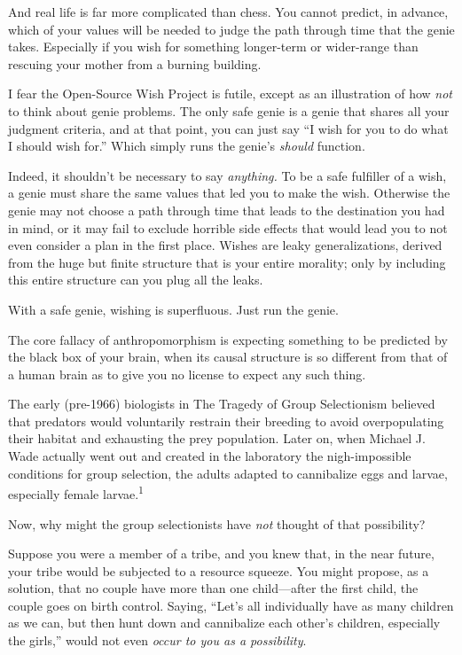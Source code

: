 {
 And real life is far more complicated than chess. You cannot
predict, in advance, which of your values will be needed to judge the
path through time that the genie takes. Especially if you wish for
something longer-term or wider-range than rescuing your mother from a
burning building.}

{
 I fear the Open-Source Wish Project is futile, except as an
illustration of how \textit{not} to think about genie problems. The
only safe genie is a genie that shares all your judgment criteria, and
at that point, you can just say ``I wish for you to do
what I should wish for.'' Which simply runs the
genie's \textit{should} function.}

{
 Indeed, it shouldn't be necessary to say
\textit{anything.} To be a safe fulfiller of a wish, a genie must share
the same values that led you to make the wish. Otherwise the genie may
not choose a path through time that leads to the destination you had in
mind, or it may fail to exclude horrible side effects that would lead
you to not even consider a plan in the first place. Wishes are leaky
generalizations, derived from the huge but finite structure that is
your entire morality; only by including this entire structure can you
plug all the leaks.}

{
 With a safe genie, wishing is superfluous. Just run the genie.}

\myendsectiontext


{
 The core fallacy of anthropomorphism is expecting something to be
predicted by the black box of your brain, when its causal structure is
so different from that of a human brain as to give you no license to
expect any such thing. }

{
 The early (pre-1966) biologists in The Tragedy of Group
Selectionism believed that predators would voluntarily restrain their
breeding to avoid overpopulating their habitat and exhausting the prey
population. Later on, when Michael J. Wade actually went out and
created in the laboratory the nigh-impossible conditions for group
selection, the adults adapted to cannibalize eggs and larvae,
especially female larvae.\textsuperscript{1}}

{
 Now, why might the group selectionists have \textit{not} thought
of that possibility?}

{
 Suppose you were a member of a tribe, and you knew that, in the
near future, your tribe would be subjected to a resource squeeze. You
might propose, as a solution, that no couple have more than one
child---after the first child, the couple goes on birth control.
Saying, ``Let's all individually have
as many children as we can, but then hunt down and cannibalize each
other's children, especially the
girls,'' would not even \textit{occur to you as a
possibility}.}

